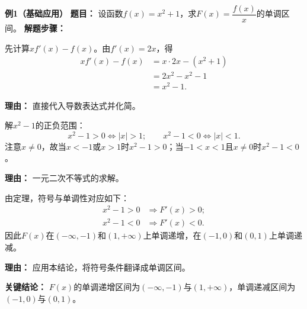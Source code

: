 \begin{examplebox}
	\textbf{\textcolor{CExample}{例1（基础应用）}}
	\textbf{\textcolor{CExample}{题目：}}
	设函数$f(x)=x^{2}+1$，求$F(x)=\dfrac{f(x)}{x}$的单调区间。
	\textbf{\textcolor{CExample}{解题步骤：}}
	\begin{description}[style=nextline, leftmargin=2.8em, labelsep=0.5em, itemsep=0.45em]
		\item[\textbf{第一步（计算条件）：}]
			先计算$x f'(x)-f(x)$。由$f'(x)=2x$，得
			\[
				\begin{aligned}
					x f'(x)-f(x) &= x\cdot 2x - (x^{2}+1) \\ &= 2x^{2} - x^{2} - 1 \\ &= x^{2}-1.
			\end{aligned}
			\]
			\par\textbf{理由：} 直接代入导数表达式并化简。
		\item[\textbf{第二步（符号区间）：}]
			解$x^{2}-1$的正负范围：
			\[
				x^{2}-1>0\iff|x|>1;\qquad x^{2}-1<0\iff|x|<1.
			\]
			注意$x\neq0$，故当$x<-1$或$x>1$时$x^{2}-1>0$；当$-1<x<1$且$x\neq0$时$x^{2}-1<0$。
			\par\textbf{理由：} 一元二次不等式的求解。
		\item[\textbf{第三步（单调结论）：}]
			由定理，符号与单调性对应如下：
			\[
				\begin{aligned}
					x^{2}-1>0 &\Rightarrow F'(x)>0; \\ x^{2}-1<0 &\Rightarrow F'(x)<0.
			\end{aligned}
			\]
			因此$F(x)$在$(-\infty,-1)$和$(1,+\infty)$上单调递增，在$(-1,0)$和$(0,1)$上单调递减。
			\par\textbf{理由：} 应用本结论，将符号条件翻译成单调区间。
	\end{description}
	\textbf{\textcolor{CExample}{关键结论：}}
	$F(x)$的单调递增区间为$(-\infty,-1)$与$(1,+\infty)$，单调递减区间为$(-1,0)$与$(0,1)$。


\end{examplebox}
